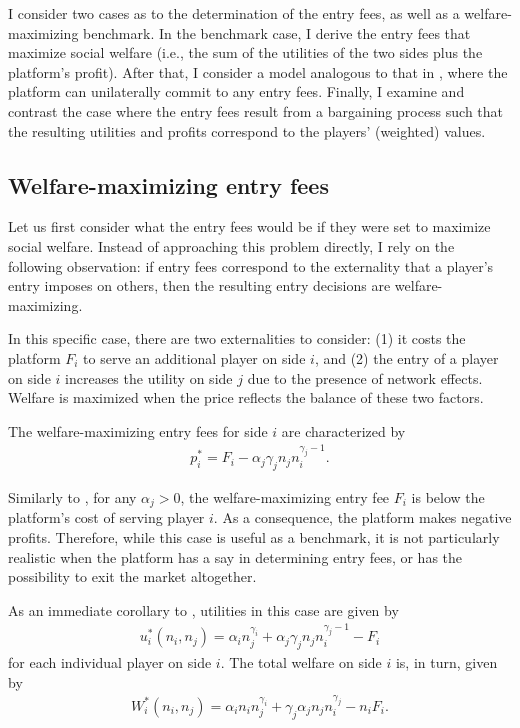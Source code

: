 I consider two cases as to the determination of the entry fees, as well as a welfare-maximizing benchmark.
In the benchmark case, I derive the entry fees that maximize social welfare (i.e., the sum of the utilities of the two sides plus the platform's profit).
After that, I consider a model analogous to that in \textcite{armstrong2006competition}, where the platform can unilaterally commit to any entry fees.
Finally, I examine and contrast the case where the entry fees result from a bargaining process such that the resulting utilities and profits correspond to the players' (weighted) values.

\subsection{Welfare-maximizing entry fees}

Let us first consider what the entry fees would be if they were set to maximize social welfare.
Instead of approaching this problem directly, I rely on the following observation: if entry fees correspond to the externality that a player's entry imposes on others, then the resulting entry decisions are welfare-maximizing.

In this specific case, there are two externalities to consider: (1) it costs the platform $F_i$ to serve an additional player on side $i$, and (2) the entry of a player on side $i$ increases the utility on side $j$ due to the presence of network effects.
Welfare is maximized when the price reflects the balance of these two factors.
\begin{proposition}
    \label{prop:welfare_max_entry_fees}
    The welfare-maximizing entry fees for side $i$ are characterized by
    \begin{align}
        p_i^* = F_i - \alpha_j \gamma_j n_j n_i^{\gamma_j - 1}.  \label{eq:welfare_max_entry_fees}
    \end{align}
\end{proposition}

Similarly to \textcite{armstrong2006competition}, for any $\alpha_j > 0$, the welfare-maximizing entry fee $F_i$ is below the platform's cost of serving player $i$.
As a consequence, the platform makes negative profits.
Therefore, while this case is useful as a benchmark, it is not particularly realistic when the platform has a say in determining entry fees, or has the possibility to exit the market altogether.

As an immediate corollary to , utilities in this case are given by
\begin{align*}
    u_i^*(n_i, n_j) = \alpha_i n_j ^ {\gamma_i} + \alpha_j \gamma_j n_j n_i^{\gamma_j - 1} - F_i
\end{align*}
for each individual player on side $i$.
The total welfare on side $i$ is, in turn, given by
\begin{align}
    W_i^*(n_i, n_j) = \alpha_i n_i n_j ^ {\gamma_i} + \gamma_j \alpha_j n_j n_i^{\gamma_j} - n_i F_i.
\end{align}

